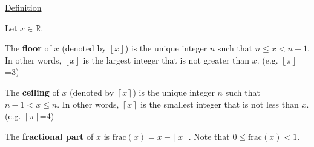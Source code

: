 \documentclass[12pt]{amsart}
\newcommand{\floor}[1]{\ensuremath{\left\lfloor #1\right\rfloor}}
\newcommand{\ceil}[1]{\ensuremath{\left\lceil #1\right\rceil}}
\begin{document}
\newpage
\noindent
\underline{Definition}

\vspace{0.05in}
\noindent
Let $x\in\mathbb{R}$.

\vspace{0.05in}
\noindent
The \textbf{floor} of $x$ (denoted by $\floor{x}$) is the unique integer $n$ such that $n\leq x< n+1$.  In other words, $\floor{x}$ is the largest integer that is not greater than $x$.  (e.g. $\floor{\pi}$=3)

\vspace{0.05in}
\noindent
The \textbf{ceiling} of $x$ (denoted by $\ceil{x}$) is the unique integer $n$ such that $n-1<x\leq n$.  In other words, $\ceil{x}$ is the smallest integer that is not less than $x$.  (e.g. $\ceil{\pi}$=4)

\vspace{0.05in}
\noindent
The \textbf{fractional part} of $x$ is $\text{frac}(x)=x-\floor{x}$.  Note that $0\leq\text{frac}(x)<1$.
\end{document}
